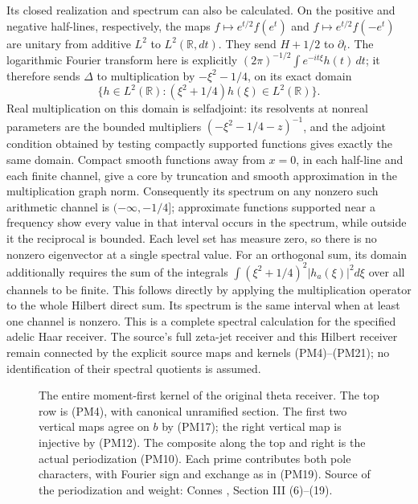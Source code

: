 Its closed realization and spectrum can also be calculated.
On the positive and negative half-lines, respectively, the maps
$f\mapsto e^{t/2}f(e^t)$ and $f\mapsto e^{t/2}f(-e^t)$
are unitary from additive $L^2$ to $L^2(\mathbb R,dt)$.
They send $H+1/2$ to $\partial_t$. The logarithmic Fourier transform here is explicitly
$(2\pi)^{-1/2}\int e^{-it\xi}h(t)\,dt$; it therefore sends $\Delta$ to multiplication by
$-\xi^2-1/4$, on its exact domain
\[
 \{h\in L^2(\mathbb R):
              (\xi^2+1/4)h(\xi)\in L^2(\mathbb R)\}.
 \tag{PM23}
\]
Real multiplication on this domain is selfadjoint: its
resolvents at nonreal parameters are the bounded multipliers
$(-\xi^2-1/4-z)^{-1}$, and the adjoint condition obtained by
testing compactly supported functions gives exactly the same
domain. Compact smooth functions away from $x=0$, in each
half-line and each finite channel, give a core by truncation
and smooth approximation in the multiplication graph norm.
Consequently its spectrum on any nonzero such arithmetic
channel is $(-\infty,-1/4]$; approximate functions supported
near a frequency show every value in that interval occurs
in the spectrum, while outside it the reciprocal is bounded.
Each level set has measure zero, so there is no nonzero
eigenvector at a single spectral value. For an orthogonal sum, its domain additionally requires the sum
of the integrals $\int(\xi^2+1/4)^2|h_a(\xi)|^2d\xi$ over all
channels to be finite. This follows directly by applying the
multiplication operator to the whole Hilbert direct sum. Its spectrum
is the same interval when at least one channel is nonzero.
This is a complete spectral calculation for the specified
adelic Haar receiver. The source's full zeta-jet receiver
and this Hilbert receiver remain connected by the explicit
source maps and kernels (PM4)--(PM21); no identification of
their spectral quotients is assumed.

\begin{figure}[ht]
\centering
{}
\caption{The entire moment-first kernel of the original theta
receiver. The top row is (PM4), with canonical unramified
section. The first two vertical maps agree on $b$ by (PM17);
the right vertical map is injective by (PM12). The composite
along the top and right is the actual periodization (PM10).
Each prime contributes both pole characters, with Fourier
sign and exchange as in (PM19). Source of the periodization
and weight: Connes \cite{Connes1998}, Section III (6)--(19).}
\end{figure}
